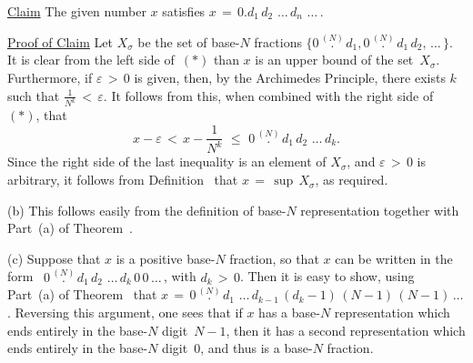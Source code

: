         \underline{Claim} The given number $x$ satisfies $x \,=\, 0.d_{1}\,d_{2}\,\,{\ldots}\,d_{n}\,\,{\ldots}\,$.

        \underline{Proof of Claim} Let $X_{{\sigma}}$ be the set of base-$N$ fractions $\{0\,\stackrel{(N)}{.}\,d_{1}, 0\,\stackrel{(N)}{.}\,d_{1}\,d_{2}, \,{\ldots}\,\}$.
    It is clear from the left side of~$({\ast})$ than $x$ is an upper bound of the set~$X_{{\sigma}}$.
    Furthermore, if ${\varepsilon}\,>\,0$ is given, then, by the Archimedes Principle,
    there exists $k$ such that ${\displaystyle \frac{1}{N^{k}}\,<\,{\varepsilon}}$.
    It follows from this, when combined with the right side of~$({\ast})$, that
        \begin{displaymath}
        x-{\varepsilon}\,<\,x- \frac{1}{N^{k}}\,\,{\leq}\,\, 0\,\stackrel{(N)}{.}\,d_{1}\,d_{2}\,\,{\ldots}\,d_{k}.
        \end{displaymath}
    Since the right side of the last inequality is an element of $X_{{\sigma}}$, and ${\varepsilon}\,>\,0$ is arbitrary,
    it follows from Definition~ that $x \,=\, {\sup}\,X_{{\sigma}}$, as required.

\V

        (b) This follows easily from the definition of base-$N$ representation together with Part~(a) of Theorem~.

\V

        (c) Suppose that $x$ is a positive base-$N$ fraction, so that $x$ can be written in the form~ $0\,\stackrel{(N)}{.}\,d_{1}\,d_{2}\,\,{\ldots}\,d_{k}\,0\,0\,{\ldots}\,$,
    with $d_{k}\,>\,0$. Then it is easy to show, using Part~(a) of Theorem~ that
    $x \,=\, 0\,\stackrel{(N)}{.}\,d_{1}\,\,{\ldots}\,d_{k-1}\,(d_{k}-1)\,(N-1)\,(N-1)\,{\ldots}\,$.
    Reversing this argument, one sees that if $x$ has a base-$N$ representation which ends entirely in the base-$N$ digit~$N-1$,
    then it has a second representation which ends entirely in the base-$N$ digit~$0$, and thus is a base-$N$ fraction.

